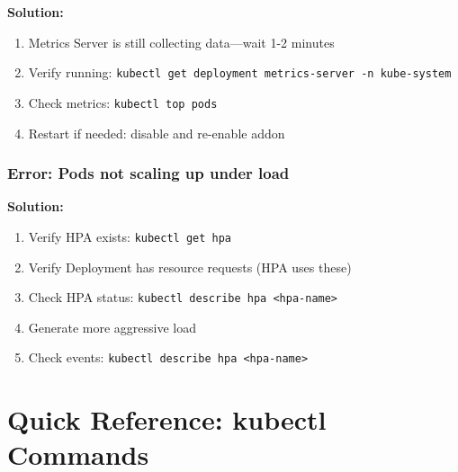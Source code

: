 \documentclass[12pt,a4paper]{article}
\begin{document}
\begin{warningbox}
\textbf{Solution:}
\begin{enumerate}
    \item Metrics Server is still collecting data—wait 1-2 minutes
    \item Verify running: \texttt{kubectl get deployment metrics-server -n kube-system}
    \item Check metrics: \texttt{kubectl top pods}
    \item Restart if needed: disable and re-enable addon
\end{enumerate}
\end{warningbox}

\subsubsection{Error: Pods not scaling up under load}

\begin{warningbox}
\textbf{Solution:}
\begin{enumerate}
    \item Verify HPA exists: \texttt{kubectl get hpa}
    \item Verify Deployment has resource requests (HPA uses these)
    \item Check HPA status: \texttt{kubectl describe hpa <hpa-name>}
    \item Generate more aggressive load
    \item Check events: \texttt{kubectl describe hpa <hpa-name>}
\end{enumerate}
\end{warningbox}

\section{Quick Reference: kubectl Commands}
\end{document}
